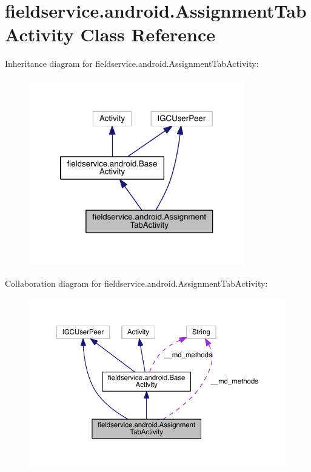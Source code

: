 \hypertarget{classfieldservice_1_1android_1_1_assignment_tab_activity}{\section{fieldservice.\+android.\+Assignment\+Tab\+Activity Class Reference}
\label{classfieldservice_1_1android_1_1_assignment_tab_activity}
}


Inheritance diagram for fieldservice.\+android.\+Assignment\+Tab\+Activity\+:
\nopagebreak
\begin{figure}[H]
\begin{center}
\leavevmode
\includegraphics[width=268pt]{classfieldservice_1_1android_1_1_assignment_tab_activity__inherit__graph}
\end{center}
\end{figure}


Collaboration diagram for fieldservice.\+android.\+Assignment\+Tab\+Activity\+:
\nopagebreak
\begin{figure}[H]
\begin{center}
\leavevmode
\includegraphics[width=350pt]{classfieldservice_1_1android_1_1_assignment_tab_activity__coll__graph}
\end{center}
\end{figure}
